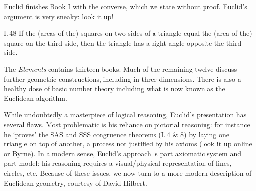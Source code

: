Euclid finishes Book I with the converse, which we state without proof. Euclid's argument is very sneaky: look it up!

\begin{thm}{I.\,48}{}
	If the (areas of the) squares on two sides of a triangle equal the (area of the) square on the third side, then the  triangle has a right-angle opposite the third side.
\end{thm}

The \emph{Elements} contains thirteen books. Much of the remaining twelve discuss further geometric constructions, including in three dimensions. There is also a healthy dose of basic number theory including what is now known as the Euclidean algorithm.\medbreak

While undoubtedly a masterpiece of logical reasoning, Euclid's presentation has several flaws. Most problematic is his reliance on pictorial reasoning: for instance he `proves' the SAS and SSS congruence theorems (I.\,4 \& 8) by laying one triangle on top of another, a process not justified by his axioms (look it up \href{http://math.furman.edu/~jpoole/euclidselements/euclid.htm}{online} or \href{http://math.uci.edu/~ndonalds/Elements-I-VI.pdf}{Byrne}). In a modern sense, Euclid's approach is part axiomatic system and part model: his reasoning requires a visual/physical representation of lines, circles, etc. Because of these issues, we now turn to a more modern description of Euclidean geometry, courtesy of David Hilbert.

\clearpage

